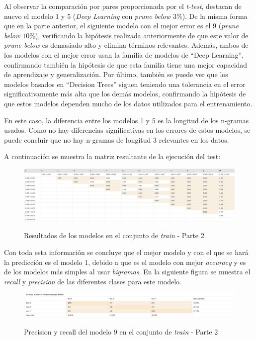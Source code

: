 \documentclass[es]{uc3mreport}
\begin{document}
\begin{report}
    Al observar la comparación por pares proporcionada por el \textit{t-test},
    destacan de nuevo el modelo 1 y 5 (\textit{Deep Learning}
    con \textit{prune below $3\%$}). De la misma forma que en la parte anterior,
    el siguiente modelo con el mejor error es el 9 (\textit{prune below $10\%$}),
    verificando la hipótesis realizada anteriormente de que este valor de
    \textit{prune below} es demasiado alto y elimina términos relevantes. Además,
    ambos de los modelos con el mejor error usan la familia de modelos de
    ``Deep Learning'', confirmando también la hipótesis de que esta familia tiene
    una mejor capacidad de aprendizaje y generalización. Por último, también se
    puede ver que los modelos basados en ``Decision Trees'' siguen teniendo una
    tolerancia en el error significativamente más alta que los demás modelos,
    confirmando la hipótesis de que estos modelos dependen mucho de los datos
    utilizados para el entrenamiento.

    En este caso, la diferencia entre los modelos 1 y 5 es la longitud de los
    n-gramas usados. Como no hay diferencias significativas en los errores de
    estos modelos, se puede concluir que no hay n-gramas de longitud 3
    relevantes en los datos.

    A continuación se muestra la matriz resultante de la ejecución del test:

    \begin{figure}[H]
        \center
        \includegraphics[width=\linewidth]{t_test2.jpg}\\ 
        \caption{Resultados de los modelos en el conjunto de \textit{train} - Parte 2}
    \end{figure}

    Con toda esta información se concluye que el mejor modelo y con el que se
    hará la predicción es el modelo 1, debido a que es el modelo con mejor
    \textit{accuracy} y es de los modelos más simples al usar \textit{bigramas}.
    En la siguiente figura se muestra el \textit{recall} y \textit{precision} de
    las diferentes clases para este modelo.

    \begin{figure}[H]
        \center
        \includegraphics[width=\linewidth]{train2.jpeg}\\ 
        \caption{Precision y recall del modelo 9 en el conjunto de \textit{train} - Parte 2}
    \end{figure}



\end{report}
\end{document}
